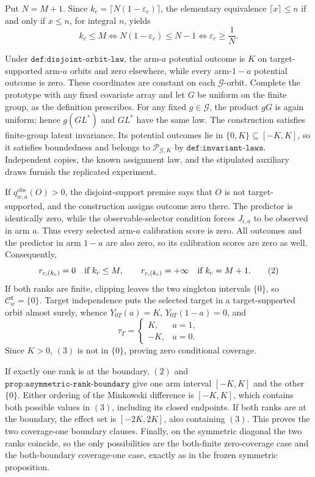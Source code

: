Put \(N=M+1\). Since \(k_c=\lceil N(1-\varepsilon_c)\rceil\), the elementary equivalence \(\lceil x\rceil\le n\) if and only if \(x\le n\), for integral \(n\), yields
\[
k_c\le M
\iff N(1-\varepsilon_c)\le N-1
\iff \varepsilon_c\ge\frac1N.
\tag{1}
\]

Under \(\texttt{def:disjoint-orbit-law}\), the arm-\(a\) potential outcome is \(K\) on target-supported arm-\(a\) orbits and zero elsewhere, while every arm-\(1-a\) potential outcome is zero. These coordinates are constant on each \(\mathcal G\)-orbit. Complete the prototype with any fixed covariate array and let \(G\) be uniform on the finite group, as the definition prescribes. For any fixed \(g\in\mathcal G\), the product \(gG\) is again uniform; hence \(g(GL^*)\) and \(GL^*\) have the same law. The construction satisfies finite-group latent invariance. Its potential outcomes lie in \(\{0,K\}\subseteq[-K,K]\), so it satisfies boundedness and belongs to \(\mathcal P_{\mathcal G,K}\) by \(\texttt{def:invariant-laws}\). Independent copies, the known assignment law, and the stipulated auxiliary draws furnish the replicated experiment.

If \(q^{\mathrm{obs}}_{w,a}(O)>0\), the disjoint-support premise says that \(O\) is not target-supported, and the construction assigns outcome zero there. The predictor is identically zero, while the observable-selector condition forces \(J_{i,a}\) to be observed in arm \(a\). Thus every selected arm-\(a\) calibration score is zero. All outcomes and the predictor in arm \(1-a\) are also zero, so its calibration scores are zero as well. Consequently,
\[
r_{c,(k_c)}=0\quad\hbox{if }k_c\le M,
\qquad
r_{c,(k_c)}=+\infty\quad\hbox{if }k_c=M+1.
\tag{2}
\]
If both ranks are finite, clipping leaves the two singleton intervals \(\{0\}\), so \(\mathcal C^{\boldsymbol\varepsilon}_w=\{0\}\). Target independence puts the selected target in a target-supported orbit almost surely, whence \(Y_{0T}(a)=K\), \(Y_{0T}(1-a)=0\), and
\[
\tau_T=\begin{cases}K,&a=1,\\-K,&a=0.\end{cases}
\tag{3}
\]
Since \(K>0\), \((3)\) is not in \(\{0\}\), proving zero conditional coverage.

If exactly one rank is at the boundary, \((2)\) and \(\texttt{prop:asymmetric-rank-boundary}\) give one arm interval \([-K,K]\) and the other \(\{0\}\). Either ordering of the Minkowski difference is \([-K,K]\), which contains both possible values in \((3)\), including its closed endpoints. If both ranks are at the boundary, the effect set is \([-2K,2K]\), also containing \((3)\). This proves the two coverage-one boundary clauses. Finally, on the symmetric diagonal the two ranks coincide, so the only possibilities are the both-finite zero-coverage case and the both-boundary coverage-one case, exactly as in the frozen symmetric proposition.